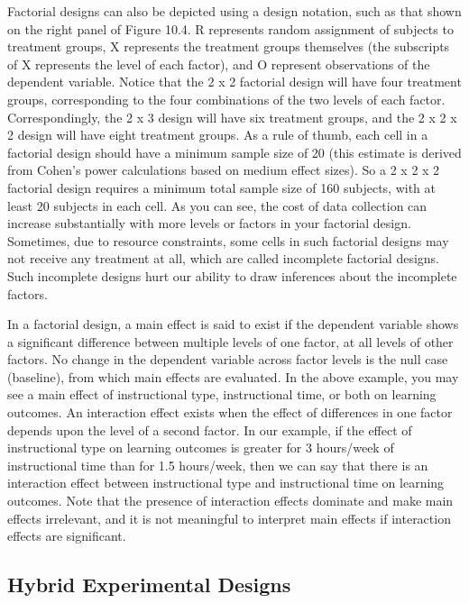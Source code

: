 Factorial designs can also be depicted using a design notation, such as that shown on the right panel of Figure 10.4. R represents random assignment of subjects to treatment groups, X represents the treatment groups themselves (the subscripts of X represents the level of each factor), and O represent observations of the dependent variable. Notice that the 2 x 2 factorial design will have four treatment groups, corresponding to the four combinations of the two levels of each factor. Correspondingly, the 2 x 3 design will have six treatment groups, and the 2 x 2 x 2 design will have eight treatment groups. As a rule of thumb, each cell in a factorial design should have a minimum sample size of 20 (this estimate is derived from Cohen’s power calculations based on medium effect sizes). So a 2 x 2 x 2 factorial design requires a minimum total sample size of 160 subjects, with at least 20 subjects in each cell. As you can see, the cost of data collection can increase substantially with more levels or factors in your factorial design. Sometimes, due to resource constraints, some cells in such factorial designs may not receive any treatment at all, which are called incomplete factorial designs. Such incomplete designs hurt our ability to draw inferences about the incomplete factors.

In a factorial design, a main effect is said to exist if the dependent variable shows a significant difference between multiple levels of one factor, at all levels of other factors. No change in the dependent variable across factor levels is the null case (baseline), from which main effects are evaluated. In the above example, you may see a main effect of instructional type, instructional time, or both on learning outcomes. An interaction effect exists when the effect of differences in one factor depends upon the level of a second factor. In our example, if the effect of instructional type on learning outcomes is greater for 3 hours/week of instructional time than for 1.5 hours/week, then we can say that there is an interaction effect between instructional type and instructional time on learning outcomes. Note that the presence of interaction effects dominate and make main effects irrelevant, and it is not meaningful to interpret main effects if interaction effects are significant.

\subsection{Hybrid Experimental Designs}

